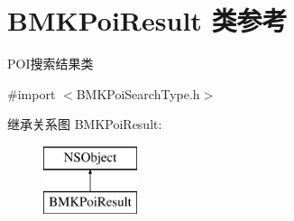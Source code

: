 \hypertarget{interface_b_m_k_poi_result}{\section{B\-M\-K\-Poi\-Result 类参考}
\label{interface_b_m_k_poi_result}
}


P\-O\-I搜索结果类  




{\ttfamily \#import $<$B\-M\-K\-Poi\-Search\-Type.\-h$>$}

继承关系图 B\-M\-K\-Poi\-Result\-:\begin{figure}[H]
\begin{center}
\leavevmode
\includegraphics[height=2.000000cm]{interface_b_m_k_poi_result}
\end{center}
\end{figure}
